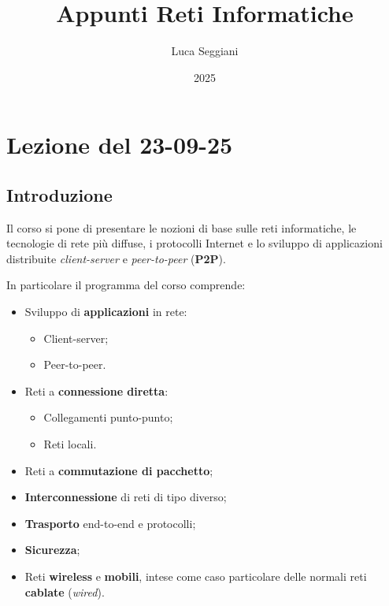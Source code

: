 \documentclass[a4paper,11pt]{article}
\title{Appunti Reti Informatiche}
\author{Luca Seggiani}
\date{2025}
\begin{document}
\section{Lezione del 23-09-25}

\thispagestyle{empty}
\pagestyle{fancy}

\subsection{Introduzione}
Il corso si pone di presentare le nozioni di base sulle reti informatiche, le tecnologie di rete più diffuse, i protocolli Internet e lo sviluppo di applicazioni distribuite \textit{client-server} e \textit{peer-to-peer} (\textbf{P2P}).

In particolare il programma del corso comprende:
\begin{itemize}
	\item Sviluppo di \textbf{applicazioni} in rete:
		\begin{itemize}
			\item Client-server;
			\item Peer-to-peer.
		\end{itemize}
	\item Reti a \textbf{connessione diretta}:
		\begin{itemize}
			\item Collegamenti punto-punto;
			\item Reti locali.
		\end{itemize}
	\item Reti a \textbf{commutazione di pacchetto};
	\item \textbf{Interconnessione} di reti di tipo diverso;
	\item \textbf{Trasporto} end-to-end e protocolli;
	\item \textbf{Sicurezza};
	\item Reti \textbf{wireless} e \textbf{mobili}, intese come caso particolare delle normali reti \textbf{cablate} (\textit{wired}).
\end{itemize}
\end{document}
